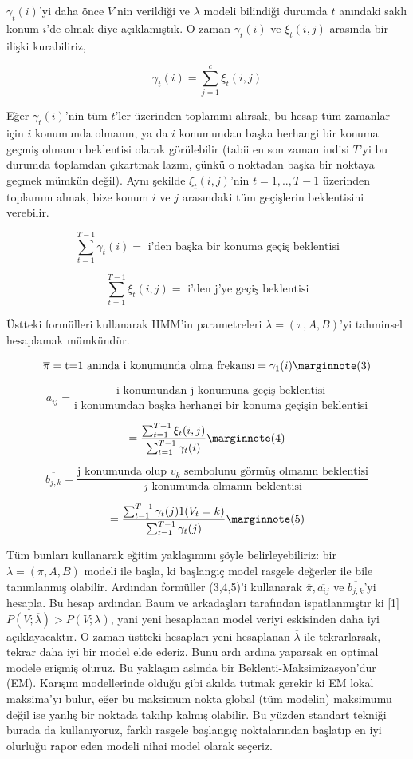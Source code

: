 \documentclass[12pt,fleqn]{article}\usepackage{../../common}
\begin{document}
$\gamma_t(i)$'yi daha önce $V$'nin verildiği ve $\lambda$ modeli bilindiği
durumda $t$ anındaki saklı konum $i$'de olmak diye açıklamıştık. O zaman 
$\gamma_t(i)$ ve $\xi_t(i,j)$ arasında bir ilişki kurabiliriz,

$$ \gamma_t(i) =  \sum _{j=1}^{c} \xi_t(i,j) $$

Eğer $\gamma_t(i)$'nin tüm $t$'ler üzerinden toplamını alırsak, bu hesap
tüm zamanlar için $i$ konumunda olmanın, ya da $i$ konumundan başka
herhangi bir konuma geçmiş olmanın beklentisi olarak görülebilir (tabii en
son zaman indisi $T$'yi bu durumda toplamdan çıkartmak lazım, çünkü o
noktadan başka bir noktaya geçmek mümkün değil). Aynı şekilde
$\xi_t(i,j)$'nin $t=1,..,T-1$ üzerinden toplamını almak, bize konum $i$ ve
$j$ arasındaki tüm geçişlerin beklentisini verebilir.


$$ \sum _{t=1}^{T-1} \gamma_t(i) = \textrm{ i'den başka bir konuma geçiş beklentisi} $$

$$ \sum _{t=1}^{T-1} \xi_t(i,j) = \textrm{ i'den j'ye geçiş beklentisi} $$

Üstteki formülleri kullanarak HMM'in parametreleri $\lambda = (\pi,A,B)
$'yi tahminsel hesaplamak mümkündür. 

$$ \overline{\pi} = \textrm{t=1 anında i konumunda olma frekansı} = \gamma_1(i)
\mlabel{3}
$$

$$ \overline{a_{ij}} = \frac{\textrm{i konumundan j konumuna geçiş beklentisi}}
{\textrm{i konumundan başka herhangi bir konuma geçişin beklentisi}}
$$

$$  = \frac{ \sum _{t=1}^{T-1}\xi_t(i,j) }{ \sum _{t=1}^{T-1} \gamma_t(i) } 
\mlabel{4}
$$

$$ 
\overline{b_{j,k}} = 
\frac{\textrm{j konumunda olup } v_k \textrm{ sembolunu görmüş olmanın beklentisi}}
{j \textrm{ konumunda olmanın beklentisi} }
 $$

$$ = \frac{\sum _{t=1}^{T-1} \gamma_t(j) 1(V_t=k) }{\sum_{t=1}^{T-1}\gamma_t(j) } 
\mlabel{5}
$$

Tüm bunları kullanarak eğitim yaklaşımını şöyle belirleyebiliriz: bir
$\lambda=(\pi,A,B)$ modeli ile başla, ki başlangıç model rasgele değerler
ile bile tanımlanmış olabilir. Ardından formüller (3,4,5)'i kullanarak
$\overline{\pi},\overline{a_{ij}}$ ve $\overline{b_{j,k}}$'yi hesapla. Bu
hesap  ardından Baum ve arkadaşları  tarafından ispatlanmıştır ki [1]
$P(V;\overline{\lambda}) > P(V;\lambda)$, yani  yeni hesaplanan model
veriyi  eskisinden daha iyi açıklayacaktır.  O zaman  üstteki hesapları 
yeni hesaplanan $\overline{\lambda}$ ile tekrarlarsak, tekrar daha 
iyi bir model elde ederiz. Bunu ardı ardına yaparsak en optimal 
modele erişmiş oluruz. Bu yaklaşım aslında bir Beklenti-Maksimizasyon'dur (EM). 
Karışım modellerinde olduğu gibi akılda tutmak gerekir ki EM lokal
maksima'yı bulur, eğer bu maksimum nokta global (tüm modelin) maksimumu
değil ise yanlış bir noktada takılıp kalmış olabilir. Bu yüzden standart
tekniği burada da kullanıyoruz, farklı rasgele başlangıç noktalarından
başlatıp en iyi olurluğu rapor eden modeli nihai model olarak seçeriz. 
\end{document}
